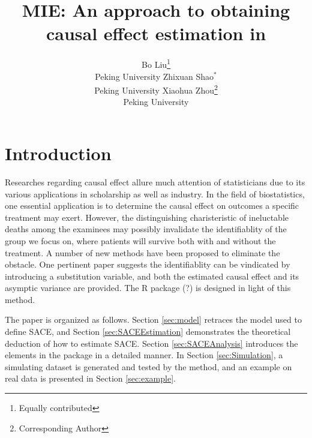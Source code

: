 \documentclass[article]{jss}
\author{Bo Liu\thanks{Equally contributed} \\ Peking University
   \And Zhixuan Shao$^*$ \\ Peking University
   \And Xiaohua Zhou\thanks{Corresponding Author} \\ Peking University}
\title{MIE: An approach to obtaining causal effect estimation in \proglang{R}}
\begin{document}


\section[Introduction: Count data regression in R]{Introduction} \label{sec:intro}


Researches regarding causal effect allure much attention of statisticians due to its various applications in scholarship as well as industry. In the field of biostatistics, one essential application is to determine the causal effect on outcomes a specific treatment may exert. However, the distinguishing charisteristic of ineluctable deaths among the examinees may possibly invalidate the identifiablity of the group we focus on, where patients will survive both with and without the treatment. A number of new methods have been proposed to eliminate the obstacle. One pertinent paper \cite{Wang2017Identification} suggests the identifiablity can be vindicated by introducing a substitution variable, and both the estimated causal effect and its asymptic variance are provided. The R package (?) is designed in light of this method.

The paper is organized as follows. Section \ref{sec:model} retraces the model \cite{Wang2017Identification} used to define SACE, and Section \ref{sec:SACEEstimation} demonstrates the theoretical deduction of how to estimate SACE. Section \ref{sec:SACEAnalysis} introduces the elements in the package  in a detailed manner. In Section \ref{sec:Simulation}, a simulating dataset is generated and tested by the method, and an example on real data is presented in Section \ref{sec:example}.



\end{document}
